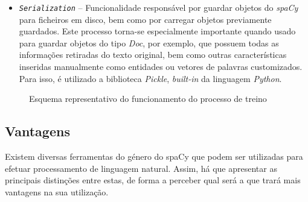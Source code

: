 \documentclass[12pt]{article}
\begin{document}
\begin{itemize}
	\item \texttt{\textit{Serialization}} -- Funcionalidade responsável por guardar objetos do \textit{spaCy} para ficheiros em disco, bem como por carregar objetos previamente guardados. Este processo torna-se especialmente importante quando usado para guardar objetos do tipo \textit{Doc}, por exemplo, que possuem todas as informações retiradas do texto original, bem como outras características inseridas manualmente como entidades ou vetores de palavras customizados. Para isso, é utilizado  a biblioteca \textit{Pickle}, \textit{built-in} da linguagem \textit{Python}.
\end{itemize}



\begin{figure}[!ht]
	\centering
	\setlength{\abovecaptionskip}{-.4cm}
	\caption{Esquema representativo do funcionamento do processo de treino}
	\label{figure:training}
\end{figure}






\subsection{Vantagens} %

Existem diversas ferramentas do género do spaCy que podem ser utilizadas para efetuar processamento de linguagem natural. Assim, há que apresentar as principais distinções entre estas, de forma a perceber qual será a que trará mais vantagens na sua utilização.
\end{document}
